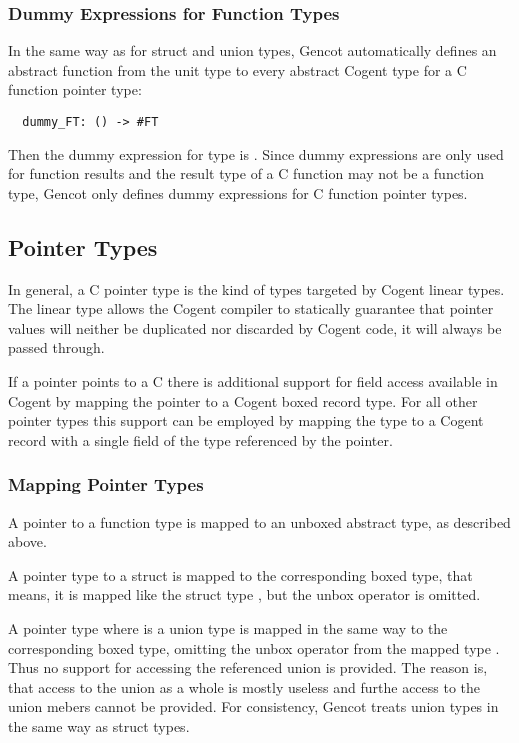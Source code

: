\subsubsection{Dummy Expressions for Function Types}

In the same way as for struct and union types, Gencot automatically defines an 
abstract function from the unit type to every abstract Cogent type  for a C function pointer type:
\begin{verbatim}
  dummy_FT: () -> #FT
\end{verbatim}

Then the dummy expression for type  is . Since dummy expressions are only used 
for function results and the result type of a C function may not be a function
type, Gencot only defines dummy expressions for C function pointer types.

\subsection{Pointer Types}
\label{design-types-pointer}

In general, a C pointer type  is the kind of types targeted by Cogent linear types. The linear type 
allows the Cogent compiler to statically guarantee that pointer values will neither be duplicated nor 
discarded by Cogent code, it will always be passed through. 

If a pointer points to a C  there is additional support for field access available in Cogent by 
mapping the pointer to a Cogent boxed record type. For all other pointer types this support can be employed by
mapping the type to a Cogent record with a single field of the type referenced by the pointer.

\subsubsection{Mapping Pointer Types}

A pointer to a function type is mapped to an unboxed abstract type, as described above.

A pointer type  to a struct is mapped to the corresponding boxed type, 
that means, it is mapped like the struct type , but the unbox operator is omitted.

A pointer type  where  is a union type is mapped in the same way to the corresponding
boxed type, omitting the unbox operator from the mapped type . Thus no support for accessing
the referenced union is provided. The reason is, that access to the union as a whole is mostly useless
and furthe access to the union mebers cannot be provided. For consistency, Gencot treats union types
in the same way as struct types.


